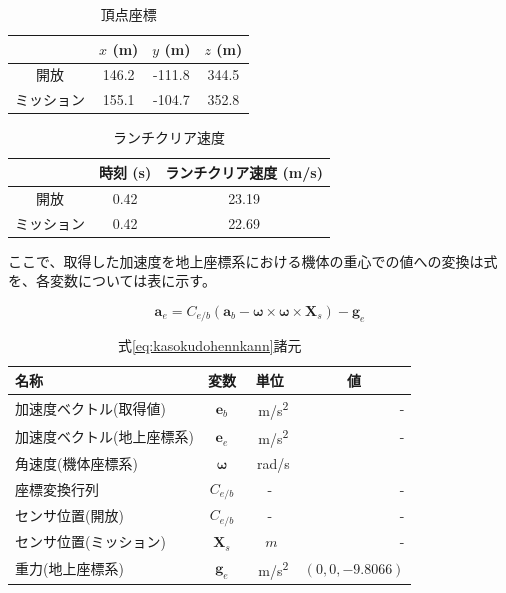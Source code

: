 \documentclass[a4paper,11pt,titlepage,uplatex]{jsarticle}
\begin{document}
\begin{table}[H]
    \centering
    \caption{頂点座標}
    \label{tab:tyouten_kiban}
    \begin{tabular}{cccc}
        \hline
              & $x$ (\si{m}) & $y$ (\si{m}) & $z$ (\si{m}) \\\hline
        開放    & 146.2        & -111.8       & 344.5        \\
        ミッション & 155.1        & -104.7       & 352.8        \\
        \hline
    \end{tabular}
\end{table}

\begin{table}[H]
    \centering
    \caption{ランチクリア速度}
    \label{tab:launch_sokudo}
    \begin{tabular}{ccc}
        \hline
              & 時刻 (\si{s}) & ランチクリア速度 (\si{m/s}) \\
        \hline
        開放    & 0.42        & 23.19               \\
        ミッション & 0.42        & 22.69               \\
        \hline
    \end{tabular}
\end{table}

ここで、取得した加速度を地上座標系における機体の重心での値への変換は式を、各変数については表に示す。

\begin{equation}
    \bm{a}_e = C_{e/b}\left(\bm{a}_b-\bm{\omega}\times \bm{\omega}\times \bm{X}_s\right)-\bm{g}_e
    \label{eq:kasokudohennkann}
\end{equation}

\begin{table}[H]
    \centering
    \caption{式\eqref{eq:kasokudohennkann}諸元}
    \label{tab:}
    \begin{tabular}{lccr}
        \hline
        名称             & 変数            & 単位           & \multicolumn{1}{c}{値} \\
        \hline
        加速度ベクトル(取得値)   & $\bm{e}_b$    & \SI{}{m/s^2} & -                     \\
        加速度ベクトル(地上座標系) & $\bm{e}_e$    & \SI{}{m/s^2} & -                     \\
        角速度(機体座標系)     & $\bm{\omega}$ & \SI{}{rad/s} &                       \\
        座標変換行列         & $C_{e/b}$     & -            & -                     \\
        センサ位置(開放)      & $C_{e/b}$     & -            & -                     \\
        センサ位置(ミッション)   & $\bm{X}_s$    & $\SI{}{m}$   & -                     \\
        重力(地上座標系)      & $\bm{g}_e$    & \SI{}{m/s^2} & $(0,0,-9.8066)$       \\
        \hline
    \end{tabular}
\end{table}
\end{document}
